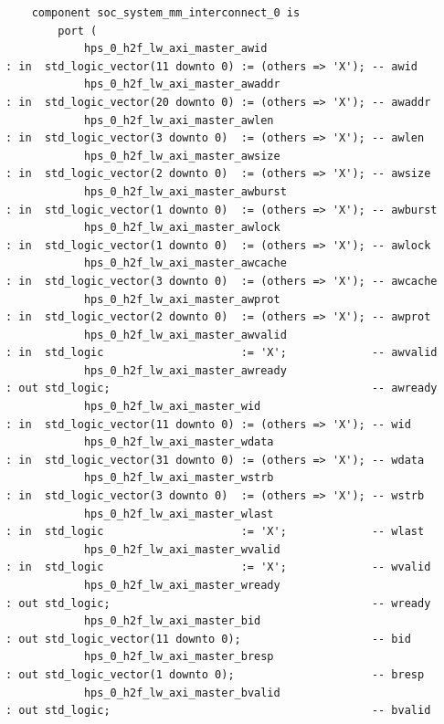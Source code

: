\documentclass[conference]{IEEEtran}
\begin{document}
\begin{lstlisting}
	component soc_system_mm_interconnect_0 is
		port (
			hps_0_h2f_lw_axi_master_awid                                        : in  std_logic_vector(11 downto 0) := (others => 'X'); -- awid
			hps_0_h2f_lw_axi_master_awaddr                                      : in  std_logic_vector(20 downto 0) := (others => 'X'); -- awaddr
			hps_0_h2f_lw_axi_master_awlen                                       : in  std_logic_vector(3 downto 0)  := (others => 'X'); -- awlen
			hps_0_h2f_lw_axi_master_awsize                                      : in  std_logic_vector(2 downto 0)  := (others => 'X'); -- awsize
			hps_0_h2f_lw_axi_master_awburst                                     : in  std_logic_vector(1 downto 0)  := (others => 'X'); -- awburst
			hps_0_h2f_lw_axi_master_awlock                                      : in  std_logic_vector(1 downto 0)  := (others => 'X'); -- awlock
			hps_0_h2f_lw_axi_master_awcache                                     : in  std_logic_vector(3 downto 0)  := (others => 'X'); -- awcache
			hps_0_h2f_lw_axi_master_awprot                                      : in  std_logic_vector(2 downto 0)  := (others => 'X'); -- awprot
			hps_0_h2f_lw_axi_master_awvalid                                     : in  std_logic                     := 'X';             -- awvalid
			hps_0_h2f_lw_axi_master_awready                                     : out std_logic;                                        -- awready
			hps_0_h2f_lw_axi_master_wid                                         : in  std_logic_vector(11 downto 0) := (others => 'X'); -- wid
			hps_0_h2f_lw_axi_master_wdata                                       : in  std_logic_vector(31 downto 0) := (others => 'X'); -- wdata
			hps_0_h2f_lw_axi_master_wstrb                                       : in  std_logic_vector(3 downto 0)  := (others => 'X'); -- wstrb
			hps_0_h2f_lw_axi_master_wlast                                       : in  std_logic                     := 'X';             -- wlast
			hps_0_h2f_lw_axi_master_wvalid                                      : in  std_logic                     := 'X';             -- wvalid
			hps_0_h2f_lw_axi_master_wready                                      : out std_logic;                                        -- wready
			hps_0_h2f_lw_axi_master_bid                                         : out std_logic_vector(11 downto 0);                    -- bid
			hps_0_h2f_lw_axi_master_bresp                                       : out std_logic_vector(1 downto 0);                     -- bresp
			hps_0_h2f_lw_axi_master_bvalid                                      : out std_logic;                                        -- bvalid

\end{lstlisting}
\end{document}
